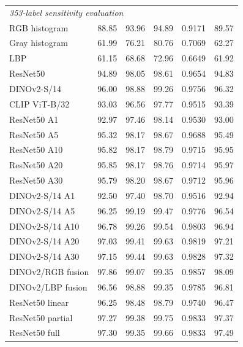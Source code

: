 \begin{tabular}{lrrrrr}
\multicolumn{6}{l}{\textit{353-label sensitivity evaluation}}\\
RGB histogram & 88.85 & 93.96 & 94.89 & 0.9171 & 89.57 \\
Gray histogram & 61.99 & 76.21 & 80.76 & 0.7069 & 62.27 \\
LBP & 61.15 & 68.68 & 72.96 & 0.6649 & 61.92 \\
ResNet50 & 94.89 & 98.05 & 98.61 & 0.9654 & 94.83 \\
DINOv2-S/14 & 96.00 & 98.88 & 99.26 & 0.9756 & 96.32 \\
CLIP ViT-B/32 & 93.03 & 96.56 & 97.77 & 0.9515 & 93.39 \\
ResNet50 A1 & 92.97 & 97.46 & 98.14 & 0.9530 & 93.00 \\
ResNet50 A5 & 95.32 & 98.17 & 98.67 & 0.9688 & 95.49 \\
ResNet50 A10 & 95.82 & 98.17 & 98.79 & 0.9715 & 95.95 \\
ResNet50 A20 & 95.85 & 98.17 & 98.76 & 0.9714 & 95.97 \\
ResNet50 A30 & 95.79 & 98.20 & 98.67 & 0.9712 & 95.96 \\
DINOv2-S/14 A1 & 92.50 & 97.40 & 98.70 & 0.9516 & 92.94 \\
DINOv2-S/14 A5 & 96.25 & 99.19 & 99.47 & 0.9776 & 96.54 \\
DINOv2-S/14 A10 & 96.78 & 99.26 & 99.54 & 0.9803 & 96.94 \\
DINOv2-S/14 A20 & 97.03 & 99.41 & 99.63 & 0.9819 & 97.21 \\
DINOv2-S/14 A30 & 97.15 & 99.44 & 99.63 & 0.9828 & 97.32 \\
DINOv2/RGB fusion & 97.86 & 99.07 & 99.35 & 0.9857 & 98.09 \\
DINOv2/LBP fusion & 96.56 & 98.88 & 99.35 & 0.9785 & 96.81 \\
ResNet50 linear & 96.25 & 98.48 & 98.79 & 0.9740 & 96.47 \\
ResNet50 partial & 97.27 & 99.38 & 99.75 & 0.9833 & 97.37 \\
ResNet50 full & 97.30 & 99.35 & 99.66 & 0.9833 & 97.49 \\
\bottomrule\end{tabular}
